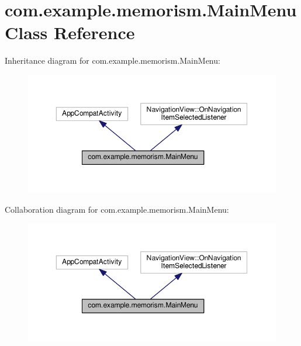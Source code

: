 \hypertarget{classcom_1_1example_1_1memorism_1_1_main_menu}{}\section{com.\+example.\+memorism.\+Main\+Menu Class Reference}
\label{classcom_1_1example_1_1memorism_1_1_main_menu}


Inheritance diagram for com.\+example.\+memorism.\+Main\+Menu\+:\nopagebreak
\begin{figure}[H]
\begin{center}
\leavevmode
\includegraphics[width=350pt]{de/ddb/classcom_1_1example_1_1memorism_1_1_main_menu__inherit__graph}
\end{center}
\end{figure}


Collaboration diagram for com.\+example.\+memorism.\+Main\+Menu\+:\nopagebreak
\begin{figure}[H]
\begin{center}
\leavevmode
\includegraphics[width=350pt]{d0/d04/classcom_1_1example_1_1memorism_1_1_main_menu__coll__graph}
\end{center}
\end{figure}
